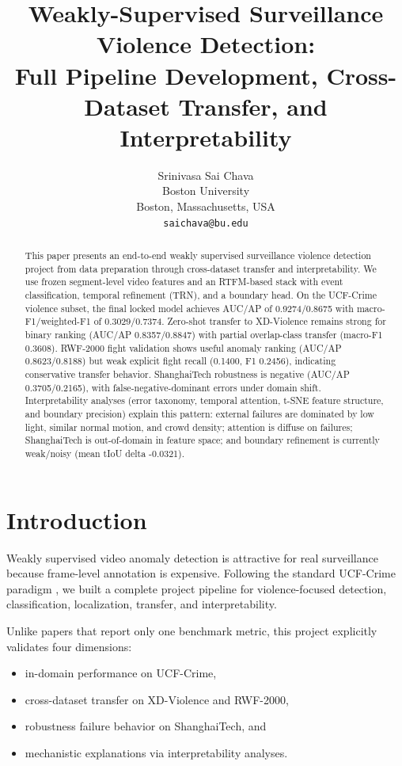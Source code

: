 \documentclass[11pt]{article}
\title{Weakly-Supervised Surveillance Violence Detection:\\
Full Pipeline Development, Cross-Dataset Transfer, and Interpretability}
\author{
  Srinivasa Sai Chava \\
  Boston University \\
  Boston, Massachusetts, USA \\
  \texttt{saichava@bu.edu}
}
\begin{document}
\maketitle

\begin{abstract}
This paper presents an end-to-end weakly supervised surveillance violence detection project from data preparation through cross-dataset transfer and interpretability. We use frozen segment-level video features and an RTFM-based stack with event classification, temporal refinement (TRN), and a boundary head. On the UCF-Crime violence subset, the final locked model achieves AUC/AP of 0.9274/0.8675 with macro-F1/weighted-F1 of 0.3029/0.7374. Zero-shot transfer to XD-Violence remains strong for binary ranking (AUC/AP 0.8357/0.8847) with partial overlap-class transfer (macro-F1 0.3608). RWF-2000 fight validation shows useful anomaly ranking (AUC/AP 0.8623/0.8188) but weak explicit fight recall (0.1400, F1 0.2456), indicating conservative transfer behavior. ShanghaiTech robustness is negative (AUC/AP 0.3705/0.2165), with false-negative-dominant errors under domain shift. Interpretability analyses (error taxonomy, temporal attention, t-SNE feature structure, and boundary precision) explain this pattern: external failures are dominated by low light, similar normal motion, and crowd density; attention is diffuse on failures; ShanghaiTech is out-of-domain in feature space; and boundary refinement is currently weak/noisy (mean tIoU delta -0.0321).
\end{abstract}

\section{Introduction}
Weakly supervised video anomaly detection is attractive for real surveillance because frame-level annotation is expensive. Following the standard UCF-Crime paradigm \citep{sultani2018real,tian2021weakly}, we built a complete project pipeline for violence-focused detection, classification, localization, transfer, and interpretability.

Unlike papers that report only one benchmark metric, this project explicitly validates four dimensions:
\begin{itemize}
  \item in-domain performance on UCF-Crime,
  \item cross-dataset transfer on XD-Violence and RWF-2000,
  \item robustness failure behavior on ShanghaiTech, and
  \item mechanistic explanations via interpretability analyses.
\end{itemize}
\end{document}
